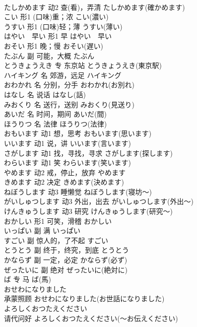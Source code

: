 \documentclass[8pt]{extreport}
\begin{document}
\begin{CJK}{UTF8}{min}
\\	たしかめます	动2	查(看)，弄清	たしかめます(確かめます)	
\\	こい	形1	(口味)重；浓	こい(濃い)	
\\	うすい	形1	(口味)轻；薄	うすい(薄い)	
\\	はやい　早い	形1	早	はやい　早い	
\\	おそい	形1	晚；慢	おそい(遅い)	
\\	たぶん	副	可能，大概	たぶん	
\\	とうきょうえき	专	东京站	とうきょうえき(東京駅)	
\\	ハイキング	名	郊游，远足	ハイキング	
\\	おわかれ	名	分别，分手	おわかれ(お別れ)	
\\	はなし	名	说话	はなし(話)	
\\	みおくり	名	送行，送别	みおくり(見送り)	
\\	あいだ	名	时间，期间	あいだ(間)	
\\	ほうりつ	名	法律	ほうりつ(法律)	
\\	おもいます	动1	想，思考	おもいます(思います)	
\\	いいます	动1	说，讲	いいます(言います)	
\\	さがします	动1	找，寻找，寻求	さがします(探します)	
\\	わらいます	动1	笑	わらいます(笑います)	
\\	やめます	动2	戒，停止，放弃	やめます	
\\	きめます	动2	决定	きめます(決めます)	
\\	ねぼうします	动3	睡懒觉	ねぼうします(寝坊～)	
\\	がいしゅつします	动3	外出，出去	がいしゅつします(外出～)	
\\	けんきゅうします	动3	研究	けんきゅうします(研究～)	
\\	おかしい	形1	可笑，滑稽	おかしい	
\\	いっぱい	副	满	いっぱい	
\\	すごい	副	惊人的，了不起	すごい	
\\	とうとう	副	终于，终究，到底	とうとう	
\\	かならず	副	一定，必定	かならず(必ず)	
\\	ぜったいに	副	绝对	ぜったいに(絶対に)	
\\	ば	专	马	ば(馬)	
\\	おせわになりました	
\\	承蒙照顾	おせわになりました(お世話になりました)	
\\	よろしくおつたえください	
\\	请代问好	よろしくおつたえください(～お伝えください)	

\end{CJK}
\end{document}
